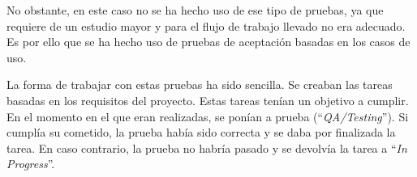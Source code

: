 No obstante, en este caso no se ha hecho uso de ese tipo de pruebas, ya que requiere de un estudio mayor y para el flujo de trabajo llevado no era adecuado. Es por ello que se ha hecho uso de pruebas de aceptación basadas en los casos de uso.

La forma de trabajar con estas pruebas ha sido sencilla. Se creaban las tareas basadas en los requisitos del proyecto. Estas tareas tenían un objetivo a cumplir. En el momento en el que eran realizadas, se ponían a prueba (``\textit{QA/Testing}''). Si cumplía su cometido, la prueba había sido correcta y se daba por finalizada la tarea. En caso contrario, la prueba no habría pasado y se devolvía la tarea a ``\textit{In Progress}''.